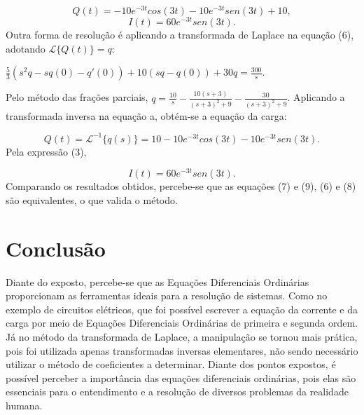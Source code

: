 \documentclass[10pt,twoside,a4paper]{article}
\begin{document}
\begin{equation}
Q(t) = - 10e^{-3t}cos(3t) -10e^{-3t}sen(3t) + 10,
\end{equation}
\begin{equation}
I(t) = 60e^{-3t}sen(3t).
\end{equation} 
Outra forma de resolução é aplicando a transformada de Laplace na equação (6), adotando $\mathcal{L}\{Q(t)\} = q$:

\begin{center}
$\displaystyle \frac{5}{3}(s^2q - sq(0) - q'(0)) + 10(sq - q(0)) + 30q = \frac{300}{s}$.
\end{center}
Pelo método das frações parciais, $\displaystyle q = \frac{10}{s} - \frac{10(s + 3)}{(s + 3)^2 + 9} - \frac{30}{(s + 3)^2 + 9}$.
Aplicando a transformada inversa na equação a, obtém-se a equação da carga:

\begin{equation}
Q(t) = \mathcal{L}^{-1}\{q(s)\} = 10 - 10e^{-3t}cos(3t) -10e^{-3t}sen(3t).
\end{equation} 
Pela expressão (3),

\begin{equation}
I(t) = 60e^{-3t}sen(3t).
\end{equation} 
Comparando os resultados obtidos, percebe-se que as equações (7) e (9), (6) e (8) são equivalentes, o que valida o método.

\section{Conclusão} %

Diante do exposto, percebe-se que as Equações Diferenciais Ordinárias proporcionam as ferramentas ideais para a resolução de sistemas. Como no exemplo de circuitos elétricos, que foi possível escrever a equação da corrente e da carga por meio de Equações Diferenciais Ordinárias de primeira e segunda ordem. 
Já no método da transformada de Laplace, a manipulação se tornou mais prática, pois foi utilizada apenas transformadas inversas elementares, não sendo necessário utilizar o método de coeficientes a determinar. Diante dos pontos expostos, é possível perceber a importância das equações diferenciais ordinárias, pois elas são essenciais para o entendimento e a resolução de diversos problemas da realidade humana.

\end{document}
